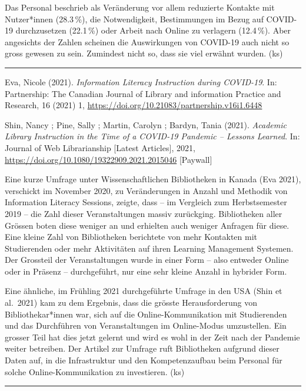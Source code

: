 \documentclass[a4paper,
fontsize=11pt,
oneside,
numbers=noperiodatend,
parskip=half-,
bibliography=totoc,
final
]{scrartcl}
\begin{document}
Das Personal beschrieb als Veränderung vor allem reduzierte Kontakte mit
Nutzer*innen (28.3\,\%), die Notwendigkeit, Bestimmungen im Bezug auf
COVID-19 durchzusetzen (22.1\,\%) oder Arbeit nach Online zu verlagern
(12.4\,\%). Aber angesichts der Zahlen scheinen die Auswirkungen von
COVID-19 auch nicht so gross gewesen zu sein. Zumindest nicht so, dass
sie viel erwähnt wurden. (ks)

\begin{center}\rule{0.5\linewidth}{0.5pt}\end{center}

Eva, Nicole (2021). \emph{Information Literacy Instruction during
COVID-19}. In: Partnership: The Canadian Journal of Library and
information Practice and Research, 16 (2021) 1,
\url{https://doi.org/10.21083/partnership.v16i1.6448}

Shin, Nancy ; Pine, Sally ; Martin, Carolyn ; Bardyn, Tania (2021).
\emph{Academic Library Instruction in the Time of a COVID-19 Pandemic --
Lessons Learned}. In: Journal of Web Librarianship {[}Latest
Articles{]}, 2021, \url{https://doi.org/10.1080/19322909.2021.2015046}
{[}Paywall{]}

Eine kurze Umfrage unter Wissenschaftlichen Bibliotheken in Kanada (Eva
2021), verschickt im November 2020, zu Veränderungen in Anzahl und
Methodik von Information Literacy Sessions, zeigte, dass -- im Vergleich
zum Herbstsemester 2019 -- die Zahl dieser Veranstaltungen massiv
zurückging. Bibliotheken aller Grössen boten diese weniger an und
erhielten auch weniger Anfragen für diese. Eine kleine Zahl von
Bibliotheken berichtete von mehr Kontakten mit Studierenden oder mehr
Aktivitäten auf ihren Learning Management Systemen. Der Grossteil der
Veranstaltungen wurde in einer Form -- also entweder Online oder in
Präsenz -- durchgeführt, nur eine sehr kleine Anzahl in hybrider Form.

Eine ähnliche, im Frühling 2021 durchgeführte Umfrage in den USA (Shin
et al.~2021) kam zu dem Ergebnis, dass die grösste Herausforderung von
Bibliothekar*innen war, sich auf die Online-Kommunikation mit
Studierenden und das Durchführen von Veranstaltungen im Online-Modus
umzustellen. Ein grosser Teil hat dies jetzt gelernt und wird es wohl in
der Zeit nach der Pandemie weiter betreiben. Der Artikel zur Umfrage
ruft Bibliotheken aufgrund dieser Daten auf, in die Infrastruktur und
den Kompetenzaufbau beim Personal für solche Online-Kommunikation zu
investieren. (ks)

\begin{center}\rule{0.5\linewidth}{0.5pt}\end{center}
\end{document}
